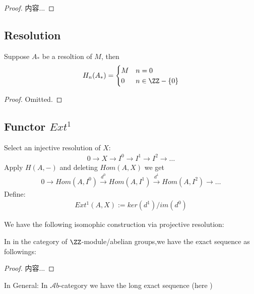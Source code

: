 \documentclass[Total.tex]{subfiles}
\begin{document}
			\begin{proposition}
				
			\end{proposition}
			\begin{proof}
				内容...
			\end{proof}
			\subsection{Resolution}
			\begin{proposition}
				Suppose $A_*$ be a resoltion of $M$, then
				\begin{gather*}
					H_n(A_*)=\begin{cases}
						M&n=0\\
						0&n\in \ZZ-\{0\}
					\end{cases}
				\end{gather*}
			\end{proposition}
			\begin{proof}
				Omitted.
			\end{proof}
			\subsection{Functor $Ext^1$}
			\begin{Def}
				Select an injective resolution of $X$:
				\begin{gather*}
					0\rightarrow X\rightarrow I^0\rightarrow I^1\rightarrow I^2\rightarrow\dots
				\end{gather*}
				Apply $H(A,-)$ and deleting $Hom(A,X)$ we get
				\begin{gather*}
					0\rightarrow Hom(A,I^0)\stackrel{d^0}{\rightarrow} Hom(A,I^1)\stackrel{d^1}{\rightarrow} Hom(A,I^2)\rightarrow \dots
				\end{gather*}
				Define:
				\begin{gather*}
					Ext^1(A,X):=ker(d^1)/im(d^0)
				\end{gather*}
			\end{Def}
			We have the following isomophic construction via projective resolution:
			\begin{proposition}
				In in the category of $\ZZ$-module/abelian groups,we have the exact sequence as followings:
				\begin{center}
				\end{center}
			\end{proposition}
			\begin{proof}
				内容...
			\end{proof}
			In General: In $\mathcal Ab$-category we have the long exact sequence (here ) 
\end{document}
